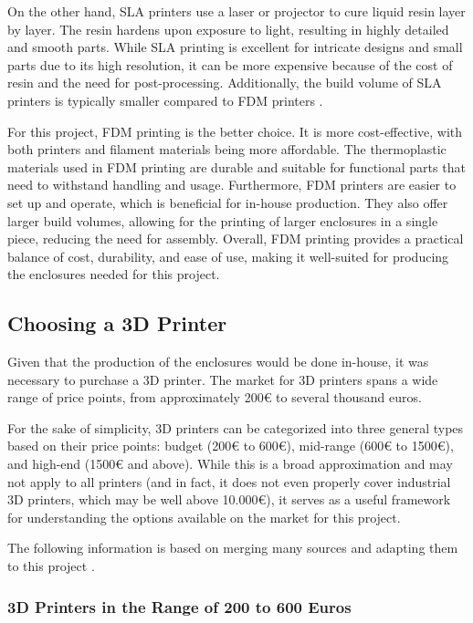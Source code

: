 On the other hand, SLA printers use a laser or projector to cure liquid resin layer by layer. The 
resin hardens upon exposure to light, resulting in highly detailed and smooth parts. While SLA 
printing is excellent for intricate designs and small parts due to its high resolution, it can be 
more expensive because of the cost of resin and the need for post-processing. Additionally, the 
build volume of SLA printers is typically smaller compared to FDM printers \cite{fdm_vs_sla}.

For this project, FDM printing is the better choice. It is more cost-effective, with both printers 
and filament materials being more affordable. The thermoplastic materials used in FDM printing are 
durable and suitable for functional parts that need to withstand handling and usage. Furthermore, 
FDM printers are easier to set up and operate, which is beneficial for in-house production. They 
also offer larger build volumes, allowing for the printing of larger enclosures in a single piece, 
reducing the need for assembly. Overall, FDM printing provides a practical balance of cost, 
durability, and ease of use, making it well-suited for producing the enclosures needed for this 
project.

\subsection{Choosing a 3D Printer}

Given that the production of the enclosures would be done in-house, it was necessary to purchase a 
3D printer. The market for 3D printers spans a wide range of price points, from approximately 200€ 
to several thousand euros.

For the sake of simplicity, 3D printers can be categorized into three general types based on their 
price points: budget (200€ to 600€), mid-range (600€ to 1500€), and high-end (1500€ and above). 
While this is a broad approximation and may not apply to all printers (and in fact, it does not 
even properly cover industrial 3D printers, which may be well above 10.000€), it serves as a 
useful framework for understanding the options available on the market for this project.

The following information is based on merging many sources and adapting them to this project 
\cite{3dprinter_cost_1} \cite{3dprinter_cost_2} \cite{3dprinter_cost_3}. 

\subsubsection*{3D Printers in the Range of 200 to 600 Euros}

